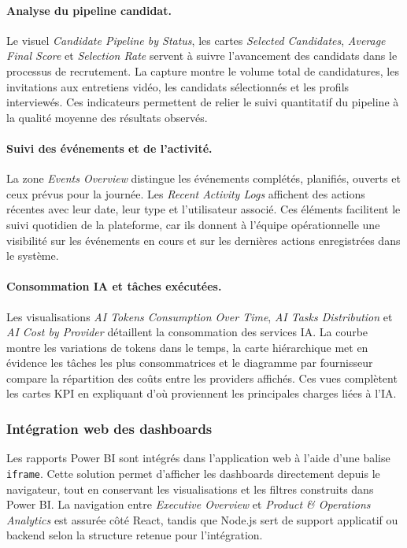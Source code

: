 \paragraph{Analyse du pipeline candidat.}
Le visuel \textit{Candidate Pipeline by Status}, les cartes \textit{Selected Candidates}, \textit{Average Final Score} et \textit{Selection Rate} servent à suivre l'avancement des candidats dans le processus de recrutement. La capture montre le volume total de candidatures, les invitations aux entretiens vidéo, les candidats sélectionnés et les profils interviewés. Ces indicateurs permettent de relier le suivi quantitatif du pipeline à la qualité moyenne des résultats observés.

\paragraph{Suivi des événements et de l'activité.}
La zone \textit{Events Overview} distingue les événements complétés, planifiés, ouverts et ceux prévus pour la journée. Les \textit{Recent Activity Logs} affichent des actions récentes avec leur date, leur type et l'utilisateur associé. Ces éléments facilitent le suivi quotidien de la plateforme, car ils donnent à l'équipe opérationnelle une visibilité sur les événements en cours et sur les dernières actions enregistrées dans le système.

\paragraph{Consommation IA et tâches exécutées.}
Les visualisations \textit{AI Tokens Consumption Over Time}, \textit{AI Tasks Distribution} et \textit{AI Cost by Provider} détaillent la consommation des services IA. La courbe montre les variations de tokens dans le temps, la carte hiérarchique met en évidence les tâches les plus consommatrices et le diagramme par fournisseur compare la répartition des coûts entre les providers affichés. Ces vues complètent les cartes KPI en expliquant d'où proviennent les principales charges liées à l'IA.
\setcounter{secnumdepth}{3}

\subsubsection{Intégration web des dashboards}

Les rapports Power BI sont intégrés dans l'application web à l'aide d'une balise \texttt{iframe}. Cette solution permet d'afficher les dashboards directement depuis le navigateur, tout en conservant les visualisations et les filtres construits dans Power BI. La navigation entre \textit{Executive Overview} et \textit{Product \& Operations Analytics} est assurée côté React, tandis que Node.js sert de support applicatif ou backend selon la structure retenue pour l'intégration.

